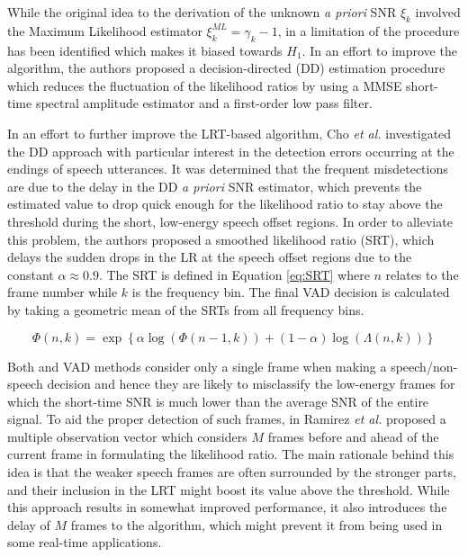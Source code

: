 While the original idea to the derivation of the unknown \emph{a priori} SNR $\xi_k$ involved the Maximum Likelihood estimator $\xi_k^{ML} = \gamma_k - 1$, in \cite{Sohn} a limitation of the procedure has been identified which makes it biased towards $H_1$. In an effort to improve the algorithm, the authors proposed a decision-directed (DD) estimation procedure which reduces the fluctuation of the likelihood ratios by using a MMSE short-time spectral amplitude estimator \cite{Ephraim} and a first-order low pass filter.

In an effort to further improve the LRT-based algorithm, Cho \emph{et al.} \cite{Cho} investigated the DD approach with particular interest in the detection errors occurring at the endings of speech utterances. It was determined that the frequent misdetections are due to the delay in the DD \emph{a priori} SNR estimator, which prevents the estimated value to drop quick enough for the likelihood ratio to stay above the threshold during the short, low-energy speech offset regions. In order to alleviate this problem, the authors proposed a smoothed likelihood ratio (SRT), which delays the sudden drops in the LR at the speech offset regions due to the constant $\alpha \approx 0.9$. The SRT is defined in Equation \ref{eq:SRT} where $n$ relates to the frame number while $k$ is the frequency bin. The final VAD decision is calculated by taking a geometric mean of the SRTs from all frequency bins.

\begin{equation}
\Phi (n,k) = \exp \left\{ \alpha \log \left( \Phi (n-1,k) \right) + (1-\alpha) \log \left( \Lambda (n,k) \right) \right\}
\label{eq:SRT}
\end{equation}

Both \cite{Sohn} and \cite{Cho} VAD methods consider only a single frame when making a speech/non-speech decision and hence they are likely to misclassify the low-energy frames for which the short-time SNR is much lower than the average SNR of the entire signal. To aid the proper detection of such frames, in \cite{RamirezMulti} Ramirez \emph{et al.} proposed a multiple observation vector which considers $M$ frames before and ahead of the current frame in formulating the likelihood ratio. The main rationale behind this idea is that the weaker speech frames are often surrounded by the stronger parts, and their inclusion in the LRT might boost its value above the threshold. While this approach results in somewhat improved performance, it also introduces the delay of $M$ frames to the algorithm, which might prevent it from being used in some real-time applications.

